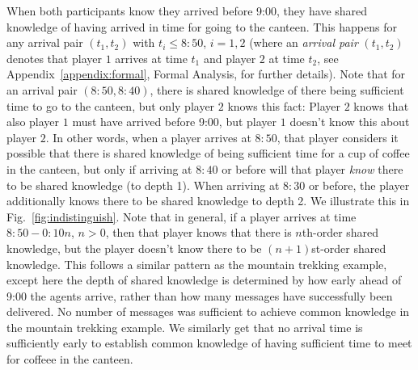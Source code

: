When both participants know they arrived before 9:00, they have shared knowledge of having arrived in time for going to the canteen. This happens for any arrival pair $(t_1,t_2)$ with $t_i \leq 8{:}50$, $i=1,2$ (where an \emph{arrival pair} $(t_1,t_2)$ denotes that player $1$ arrives at time $t_1$ and player $2$ at time $t_2$, see Appendix~\ref{appendix:formal}, Formal Analysis, for further details). Note that for an arrival pair $(8{:}50,8{:}40)$, there is shared knowledge of there being sufficient time to go to the canteen, but only player $2$ knows this fact: Player $2$ knows that also player $1$ must have arrived before 9{:}00, but player $1$ doesn't know this about player $2$. In other words, when a player arrives at $8{:}50$, that player considers it possible that there is shared knowledge of being sufficient time for a cup of coffee in the canteen, but only if arriving at $8{:}40$ or before will that player \emph{know} there to be shared knowledge (to depth 1). When arriving at $8{:}30$ or before, the player additionally knows there to be shared knowledge to depth 2. We illustrate this in Fig.~\ref{fig:indistinguish}. Note that in general, if a player arrives at time $8{:}50-0{:}10n$, $n>0$, then that player knows that there is $n$th-order shared knowledge, but the player doesn't know there to be $(n+1)$st-order shared knowledge. This follows a similar pattern as the mountain trekking example, except here the depth of shared knowledge is determined by how early ahead of 9:00 the agents arrive, rather than how many messages have successfully been delivered. No number of messages was sufficient to achieve common knowledge in the mountain trekking example. We similarly get that no arrival time is sufficiently early to establish common knowledge of having sufficient time to meet for coffeee in the canteen. 

